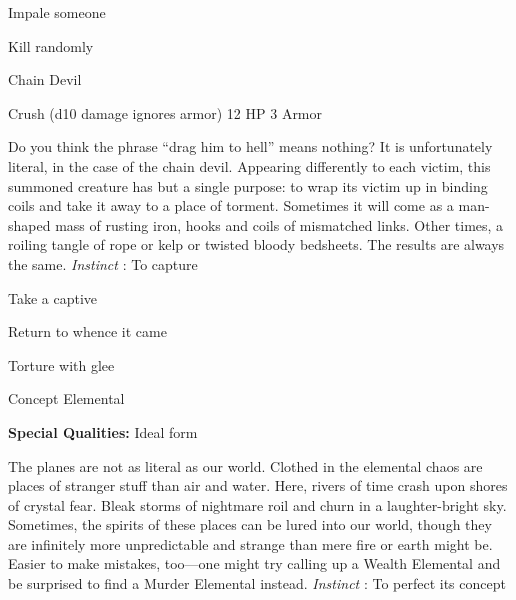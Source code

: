 \startitemize[1,packed]

\item Impale someone

 
\item Kill randomly


\stopitemize
 
\startMonsterName
Chain Devil	 
\stopMonsterName
 

Crush (d10 damage ignores armor)	12 HP	3 Armor

 


 
\startMonsterDescription
Do you think the phrase “drag him to hell” means nothing? It is unfortunately literal, in the case of the chain devil. Appearing differently to each victim, this summoned creature has but a single purpose: to wrap its victim up in binding coils and take it away to a place of torment. Sometimes it will come as a man-shaped mass of rusting iron, hooks and coils of mismatched links. Other times, a roiling tangle of rope or kelp or twisted bloody bedsheets. The results are always the same. {\em Instinct} : To capture
\stopMonsterDescription
 
\startitemize[1,packed]

\item Take a captive

 
\item Return to whence it came

 
\item Torture with glee


\stopitemize
 
\startMonsterName
Concept Elemental	 
\stopMonsterName
 
\startMonsterQualities
{\bf Special Qualities:}  Ideal form
\stopMonsterQualities
 
\startMonsterDescription
The planes are not as literal as our world. Clothed in the elemental chaos are places of stranger stuff than air and water. Here, rivers of time crash upon shores of crystal fear. Bleak storms of nightmare roil and churn in a laughter-bright sky. Sometimes, the spirits of these places can be lured into our world, though they are infinitely more unpredictable and strange than mere fire or earth might be. Easier to make mistakes, too—one might try calling up a Wealth Elemental and be surprised to find a Murder Elemental instead. {\em Instinct} : To perfect its concept
\stopMonsterDescription
 
